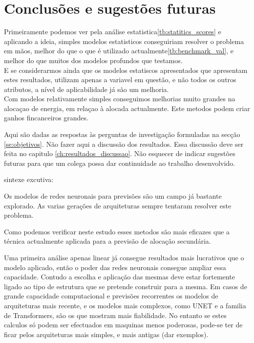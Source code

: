 \chapter{Conclusões e sugestões futuras}

Primeiramente podemos ver pela análise estatistica\ref{tb:statitics_scores} e aplicando a ideia\cite{Elsayed}, simples modelos estatisticos conseguiriam resolver o problema em mãos, melhor do que o que é utilizado actualmente\ref{tb:benchmark_val}, e melhor do que muitos dos modelos profundos que testamos. \\
E se considerarmos ainda que os modelos estatiscos apresentados que apresentam estes resultados, utilizam apenas a variavel em questão, e não todos os outros atributos, a nível de aplicabilidade já são um melhoria. \\

Com modelos relativamente simples conseguimos melhorias muito grandes na alocaçao de energia, em relaçao à alocada actualmente. Este metodos podem criar ganhos fincanceiros grandes.



Aqui são dadas as respostas às perguntas de investigação formuladas na secção \ref{se:objetivos}. Não fazer aqui a discussão dos resultados. Essa discussão deve ser feita no capitulo \ref{ch:resultados_discussao}. Não esquecer de indicar sugestões futuras para que um colega possa dar continuidade ao trabalho desenvolvido. 


sintexe excutiva:

Os modelos de redes neuronais para previsões são um campo já bastante explorado. As varias gerações de arquiteturas sempre tentaram resolver este problema.


Como podemos verificar neste estudo esses metodos são mais eficazes que a técnica actualmente aplicada para a previsão de alocação secundária.

Uma primeira análise apenas linear já consegue resultados mais lucrativos que o modelo aplicado, então o poder das redes neuronais consegue ampliar essa capacidade.
Contudo a escolha e aplicação das mesmas deve estar fortemente ligado ao tipo de estrutura que se pretende construir para a mesma.
Em casos de grande capacidade computacional e previsões recorrentes os modelos de arquiteturas mais recente, e os modelos mais complexos, como UNET e a familia de Transformers, são os que mostram mais fiabilidade.
No entanto se estes calculos só podem ser efectuados em maquinas menos poderosas, pode-se ter de ficar pelos arquiteturas mais simples, e mais antigas (dar exemplos).

